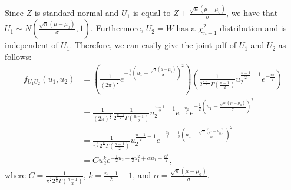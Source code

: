 \documentclass[11pt]{article} %
\begin{document}
Since $Z$ is standard normal and $U_1$ is equal to $Z +  \frac{\sqrt{n}(\mu-\mu_0)}{\sigma}$, we have that $U_1 \sim N( \frac{\sqrt{n}(\mu-\mu_0)}{\sigma}, 1)$. Furthermore, $U_2 = W$ has a $\chi^2_{n-1}$ distribution and is independent of $U_1$. Therefore, we can easily give the joint pdf of $U_1$ and $U_2$ as follows: 
\begin{align*}
f_{U_1 U_2} (u_1, u_2) &= \left(\frac{1}{(2\pi)^{\frac{1}2}}e^{-\frac{1}{2} (u_1 - \frac{\sqrt{n}(\mu-\mu_0)}{\sigma})^2}\right)\left(\frac{1}{2^{\frac{n-1}2} \Gamma(\frac{n-1}2)}u_2^{\frac{n-1}{2} -1}e^{-\frac{u_2}2}\right)\\
&= \frac{1}{(2\pi)^{\frac{1}2}}\frac{1}{2^{\frac{n-1}2} \Gamma(\frac{n-1}2)}u_2^{\frac{n-1}{2} -1}e^{-\frac{u_2}2}e^{-\frac{1}{2} (u_1 - \frac{\sqrt{n}(\mu-\mu_0)}{\sigma})^2}\\
&= \frac{1}{\pi^{\frac{1}2} 2^{\frac{n}2} \Gamma(\frac{n-1}2)}u_2^{\frac{n-1}{2} -1}e^{-\frac{u_2}2-\frac{1}{2} (u_1 - \frac{\sqrt{n}(\mu-\mu_0)}{\sigma})^2}\\
& = C u_2^ k e^{-\frac{1}{2}u_2 - \frac{1}2 u_1^2 + \alpha u_1 - \frac{ \alpha^2}{2}},
\end{align*}
where $C =\frac{1}{\pi^{\frac{1}2} 2^{\frac{n}2} \Gamma(\frac{n-1}2)}$, $k = \frac{n-1}{2} -1$, and $\alpha = \frac{\sqrt{n}(\mu-\mu_0)}{\sigma}$. 
\end{document}

